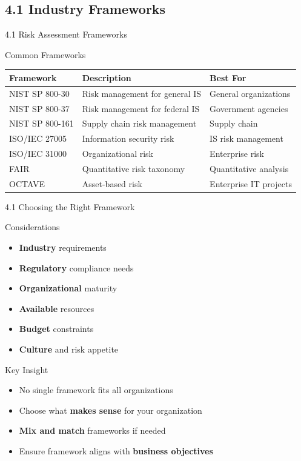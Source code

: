 \documentclass[9pt]{beamer}  %
\begin{document}
	\subsection{4.1 Industry Frameworks}
	\begin{frame}{4.1 Risk Assessment Frameworks}
		\begin{block}{Common Frameworks}
			\begin{tabular}{|p{2.5cm}|p{4cm}|p{4.5cm}|}
				\hline
				\textbf{Framework} & \textbf{Description} & \textbf{Best For} \\
				\hline
				NIST SP 800-30 & Risk management for general IS & General organizations \\
				\hline
				NIST SP 800-37 & Risk management for federal IS & Government agencies \\
				\hline
				NIST SP 800-161 & Supply chain risk management & Supply chain \\
				\hline
				ISO/IEC 27005 & Information security risk & IS risk management \\
				\hline
				ISO/IEC 31000 & Organizational risk & Enterprise risk \\
				\hline
				FAIR & Quantitative risk taxonomy & Quantitative analysis \\
				\hline
				OCTAVE & Asset-based risk & Enterprise IT projects \\
				\hline
			\end{tabular}
		\end{block}
	\end{frame}
	
	\begin{frame}{4.1 Choosing the Right Framework}
		\begin{block}{Considerations}
			\begin{itemize}
				\item \textbf{Industry} requirements
				\item \textbf{Regulatory} compliance needs
				\item \textbf{Organizational} maturity
				\item \textbf{Available} resources
				\item \textbf{Budget} constraints
				\item \textbf{Culture} and risk appetite
			\end{itemize}
		\end{block}
		
		\begin{exampleblock}{Key Insight}
			\begin{itemize}
				\item No single framework fits all organizations
				\item Choose what \textbf{makes sense} for your organization
				\item \textbf{Mix and match} frameworks if needed
				\item Ensure framework aligns with \textbf{business objectives}
			\end{itemize}
		\end{exampleblock}
	\end{frame}
	
\end{document}
